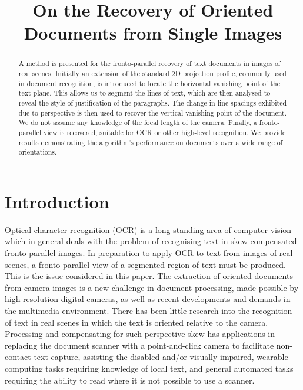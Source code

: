 \documentclass{article}
\title{On the Recovery of Oriented Documents from Single Images}
\begin{document}

\maketitle

\begin{abstract}
{ \ninept
A method is presented for the fronto-parallel recovery of text documents in images of real scenes.
Initially an extension of the standard 2D projection profile, commonly used in document recognition, is introduced to locate the horizontal vanishing point of the text plane.
This allows us to segment the lines of text, which are then analysed to reveal the style of justification of the paragraphs.
The change in line spacings exhibited due to perspective is then used to recover the vertical vanishing point of the document.  We do not assume any knowledge of the focal length of the camera.
Finally, a fronto-parallel view is recovered, suitable for OCR or other high-level recognition.
We provide results demonstrating the algorithm's performance on documents over a wide range of orientations.
}
\end{abstract}

\section{Introduction}

Optical character recognition (OCR) is a long-standing area of computer vision which
in general deals with the problem of recognising text in 
skew-compensated fronto-parallel images.
In preparation to apply OCR to text from images of real scenes,
a fronto-parallel view of a segmented region of text must be produced.
This is the issue considered in this paper.
The extraction of oriented documents from camera images is a new challenge in document processing, made possible by high resolution digital cameras, as well as recent developments and demands in the multimedia environment.
There has been little research into the recognition of text in real scenes in which the text is oriented relative to the camera.
Processing and compensating for such perspective skew has
applications in
replacing the document scanner with a point-and-click camera to facilitate non-contact text capture,
assisting the disabled and/or visually impaired,
wearable computing tasks requiring knowledge of local text,
and general automated tasks requiring the ability to read
where it is not possible to use a scanner.
\end{document}
